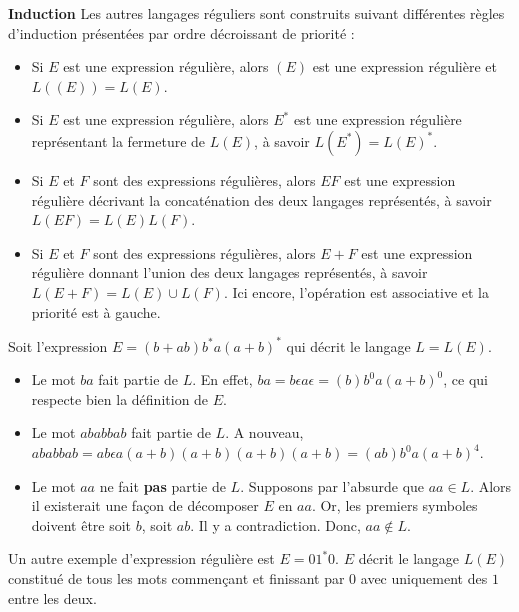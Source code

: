 \textbf{Induction}
Les autres langages réguliers sont construits suivant différentes règles d'induction présentées par ordre décroissant de priorité :

\begin{itemize}
	\item Si $E$ est une expression régulière, alors $(E)$ est une expression régulière et $L((E)) = L(E)$.
	\item Si $E$ est une expression régulière, alors $E^*$ est une expression régulière représentant la fermeture de $L(E)$, à savoir $L(E^*) = L(E)^*$.
	\item Si $E$ et $F$ sont des expressions régulières, alors $EF$ est une expression régulière décrivant la concaténation des deux langages représentés, à savoir $L(EF)=L(E)L(F)$.
	\item Si $E$ et $F$ sont des expressions régulières, alors $E+F$ est une expression régulière donnant l'union des deux langages représentés, à savoir $L(E+F)=L(E)\cup L(F)$. Ici encore, l'opération est associative et la priorité est à gauche.
\end{itemize}

\begin{example}
	Soit l'expression $E = (b+ab)b^*a(a+b)^*$ qui décrit le langage $L=L(E)$.\\
	\begin{itemize}
		\item Le mot $ba$ fait partie de $L$. En effet, $ba=b\epsilon a \epsilon=(b)b^0a(a+b)^0$, ce qui respecte bien la définition de $E$.
		\item Le mot $ababbab$ fait partie de $L$. A nouveau, $ababbab=ab\epsilon a (a+b)(a+b)(a+b)(a+b)=(ab)b^0a(a+b)^4$.
		\item Le mot $aa$ ne fait \textbf{pas} partie de $L$. Supposons par l'absurde que $aa \in L$. Alors il existerait une façon de décomposer $E$ en $aa$. Or, les premiers symboles doivent être soit $b$, soit $ab$. Il y a contradiction. Donc, $aa \notin L$.
	\end{itemize}
	\label{ex:regex}
\end{example}

Un autre exemple d'expression régulière est $E=01^*0$. $E$ décrit le langage $L(E)$ constitué de tous les mots commençant et finissant par $0$ avec uniquement des $1$ entre les deux.
